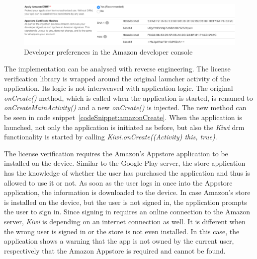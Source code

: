 \begin{figure}[h]
    \centering
    \includegraphics[width=1\textwidth]{data/amazon.png}
    \caption{Developer preferences in the Amazon developer console \cite{amazonDeveloper}}
    \label{fig:amazon}
\end{figure}
\newline
The implementation can be analysed with reverse engineering.
The license verification library is wrapped around the original launcher activity of the application.
Its logic is not interweaved with application logic.
The original \textit{onCreate()} method, which is called when the application is started, is renamed to \textit{onCreateMainActivity()} and a new \textit{onCreate()} is injected.
The new method can be seen in code snippet~\ref{codeSnippet:amazonCreate}.
When the application is launched, not only the application is initiated as before, but also the \textit{Kiwi} \gls{drm} functionality is started by calling \textit{Kiwi.onCreate((Activity) this, true)}.
\newline

The license verification requires the Amazon's Appstore application to be installed on the device.
Similar to the Google Play server, the store application has the knowledge of whether the user has purchased the application and thus is allowed to use it or not.
As soon as the user logs in once into the Appstore application, the information is downloaded to the device.
In case Amazon's store is installed on the device, but the user is not signed in, the application prompts the user to sign in.
Since signing in requires an online connection to the Amazon server, \textit{Kiwi} is depending on an internet connection as well.
It is different when the wrong user is signed in or the store is not even installed.
In this case, the application shows a warning that the app is not owned by the current user, respectively that the Amazon Appstore is required and cannot be found.

